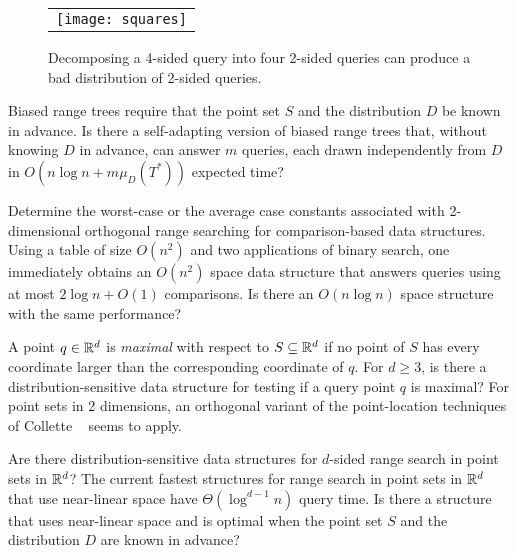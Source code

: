 \documentclass[charterfonts]{patmorin}
\begin{document}
\begin{figure}
  \begin{center}
    \begin{tabular}{c}
      \texttt{[image: squares]}
    \end{tabular}
  \end{center}
  \caption{Decomposing a 4-sided query into four 2-sided queries can
           produce a bad distribution of 2-sided queries.}
\end{figure}



\begin{op}
Biased range trees require that the point set $S$ and the
distribution $D$ be known in advance.  Is
there a self-adapting version of biased range trees that, without
knowing $D$ in advance, can answer $m$ queries, each drawn
independently from $D$ in $O(n\log n+ m\mu_D(T^*))$ expected time?
\end{op}

\begin{op}
Determine the worst-case or the average case constants associated with
2-dimensional orthogonal range searching for comparison-based data
structures.  Using a table of size $O(n^2)$ and two applications of binary
search, one immediately obtains an $O(n^2)$ space data structure that
answers queries using at most $2\log n + O(1)$ comparisons.  Is there an
$O(n\log n)$ space structure with the same performance?
\end{op}

\begin{op}
A point $q\in \mathbb{R}^d$ is \emph{maximal} with respect to $S\subseteq\mathbb{R}^d$
if no point of $S$ has every coordinate larger than the corresponding
coordinate of $q$. For $d\ge 3$,  is there a distribution-sensitive 
data structure for
testing if a query point $q$ is maximal?  For point sets in 2
dimensions, an orthogonal variant of the point-location techniques of Collette
\etal\ \cite{cdilm08} seems to apply. 
\end{op}


\begin{op}
Are there distribution-sensitive data structures for $d$-sided range
search in point sets in $\mathbb{R}^d$?  The current fastest structures
for range search in point sets in $\mathbb{R}^d$ that use near-linear space have
$\Theta(\log^{d-1} n)$ query time.  Is there a structure that uses
near-linear space and is optimal
when the point set $S$ and the distribution $D$ are known in advance?
\end{op}



\end{document}
